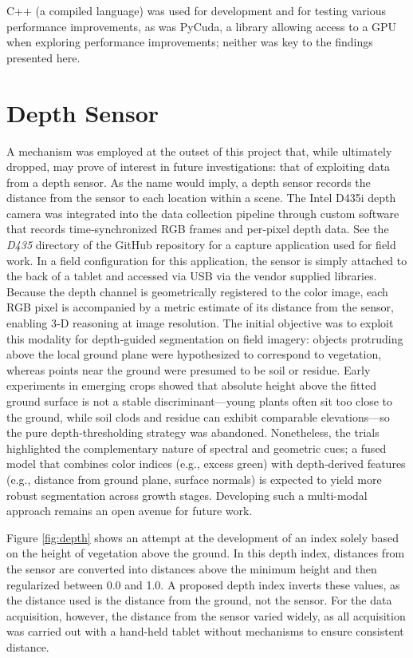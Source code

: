 \documentclass[letterpaper, notitlepage]{report}
\begin{document}
C++ (a compiled language) was used for development and for testing various performance improvements, as was PyCuda, a library allowing access to a GPU when exploring performance improvements; neither was key to the findings presented here.

\chapter{Depth Sensor}

A mechanism was employed at the outset of this project that, while ultimately dropped, may prove of interest in future investigations: that of exploiting data from a depth sensor. As the name would imply, a depth sensor records the distance from the sensor to each location within a scene. The Intel D435i depth camera was integrated into the data collection pipeline through custom software that records time‑synchronized RGB frames and per‑pixel depth data. See the \textit{D435} directory of the GitHub repository for a capture application used for field work. In a field configuration for this application, the sensor is simply attached to the back of a tablet and accessed via USB via the vendor supplied libraries. Because the depth channel is geometrically registered to the color image, each RGB pixel is accompanied by a metric estimate of its distance from the sensor, enabling 3‑D reasoning at image resolution. The initial objective was to exploit this modality for depth‑guided segmentation on field imagery: objects protruding above the local ground plane were hypothesized to correspond to vegetation, whereas points near the ground were presumed to be soil or residue. Early experiments in emerging crops showed that absolute height above the fitted ground surface is not a stable discriminant---young plants often sit too close to the ground, while soil clods and residue can exhibit comparable elevations---so the pure depth‑thresholding strategy was abandoned. Nonetheless, the trials highlighted the complementary nature of spectral and geometric cues; a fused model that combines color indices (e.g., excess green) with depth‑derived features (e.g., distance from ground plane, surface normals) is expected to yield more robust segmentation across growth stages. Developing such a multi-modal approach remains an open avenue for future work.

Figure \ref{fig:depth} shows an attempt at the development of an index solely based on the height of vegetation above the ground. In this depth index, distances from the sensor are converted into distances above the minimum height and then regularized between 0.0 and 1.0. A proposed depth index inverts these values, as the distance used is the distance from the ground, not the sensor. For the data acquisition, however, the distance from the sensor varied widely, as all acquisition was carried out with a hand-held tablet without mechanisms to ensure consistent distance.
\end{document}
